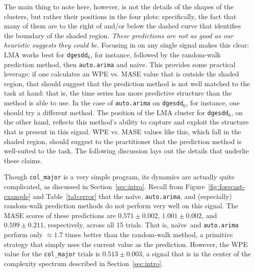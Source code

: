 \documentclass[%
pre,
reprint,
superscriptaddress,
showpacs,
nofootinbib,
nobibnotes,
 amsmath,amssymb,
 aps,
]{revtex4-1}
\newcommand{\svdsix}{{\tt dgesdd$_6$}\xspace}
\newcommand{\arima}{{\tt auto.arima}\xspace}
\newcommand{\naive}{na\"ive}
\newcommand{\col}{{\tt col\_major}\xspace}
\begin{document}
The main thing to note here, however, is not the details of the shapes
of the clusters, but rather their positions in the four plots:
specifically, the fact that many of them are to the right of and/or
below the dashed curve that identifies the boundary of the shaded
region.  \emph{These predictions are not as good as our heuristic
  suggests they could be.}  Focusing in on any single signal makes
this clear: LMA works best for \svdsix, for instance, followed by the
random-walk prediction method, then \arima and \naive.  This provides
some practical leverage: if one calculates an WPE vs. MASE value that
is outside the shaded region, that should suggest that the prediction
method is not well matched to the task at hand: that is, the time
series has more predictive structure than the method is able to use.
%
%
In the case of \arima on \svdsix, for instance, one should try a
different method.  The position of the LMA cluster for \svdsix, on the
other hand, reflects this method's ability to capture and exploit the
structure that is present in this signal.  WPE vs. MASE values like
this, which fall in the shaded region, should suggest to the
practitioner that the prediction method is well-suited to the task.
The following discussion lays out the details that underlie these
claims.
%
%

Though \col is a very simple program, its dynamics are actually quite
complicated, as discussed in Section~\ref{sec:intro}.  Recall from
Figure~\ref{fig:forecast-example} and Table~\ref{tab:error} that the
\naive, \arima, and (especially) random-walk prediction methods do not
perform very well on this signal.  The MASE scores of these
predictions are $0.571 \pm 0.002$, $1.001 \pm 0.002$, and $0.599 \pm
0.211$, respectively, across all 15 trials.  That is, \naive ~and
\arima perform only $\approx 1.7$ times better than the random-walk
method, a primitive strategy that simply uses the current value as the
prediction.  However, the WPE value for the \col trials is $0.513 \pm
0.003$, a signal that is in the center of the complexity spectrum
described in Section~\ref{sec:intro}.
\end{document}
